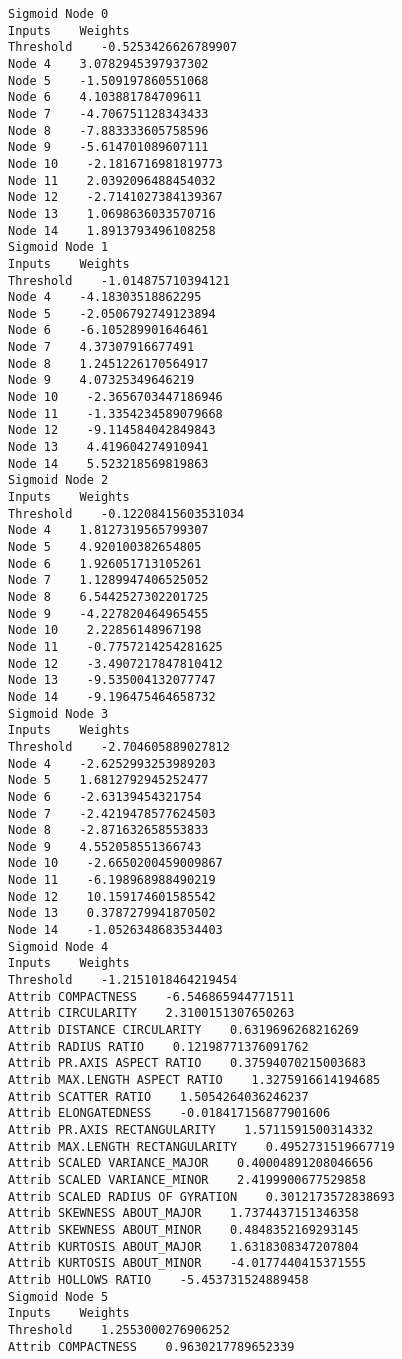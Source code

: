 \documentclass[
	article,			%
	11pt,				%
	oneside,			%
	a4paper,			%
	english,			%
	brazil,				%
	sumario=tradicional
	]{abntex2}
\begin{document}
\begin{lstlisting}
Sigmoid Node 0
Inputs    Weights
Threshold    -0.5253426626789907
Node 4    3.0782945397937302
Node 5    -1.509197860551068
Node 6    4.103881784709611
Node 7    -4.706751128343433
Node 8    -7.883333605758596
Node 9    -5.614701089607111
Node 10    -2.1816716981819773
Node 11    2.0392096488454032
Node 12    -2.7141027384139367
Node 13    1.0698636033570716
Node 14    1.8913793496108258
Sigmoid Node 1
Inputs    Weights
Threshold    -1.014875710394121
Node 4    -4.18303518862295
Node 5    -2.0506792749123894
Node 6    -6.105289901646461
Node 7    4.37307916677491
Node 8    1.2451226170564917
Node 9    4.07325349646219
Node 10    -2.3656703447186946
Node 11    -1.3354234589079668
Node 12    -9.114584042849843
Node 13    4.419604274910941
Node 14    5.523218569819863
Sigmoid Node 2
Inputs    Weights
Threshold    -0.12208415603531034
Node 4    1.8127319565799307
Node 5    4.920100382654805
Node 6    1.926051713105261
Node 7    1.1289947406525052
Node 8    6.5442527302201725
Node 9    -4.227820464965455
Node 10    2.22856148967198
Node 11    -0.7757214254281625
Node 12    -3.4907217847810412
Node 13    -9.535004132077747
Node 14    -9.196475464658732
Sigmoid Node 3
Inputs    Weights
Threshold    -2.704605889027812
Node 4    -2.6252993253989203
Node 5    1.6812792945252477
Node 6    -2.63139454321754
Node 7    -2.4219478577624503
Node 8    -2.871632658553833
Node 9    4.552058551366743
Node 10    -2.6650200459009867
Node 11    -6.198968988490219
Node 12    10.159174601585542
Node 13    0.3787279941870502
Node 14    -1.0526348683534403
Sigmoid Node 4
Inputs    Weights
Threshold    -1.2151018464219454
Attrib COMPACTNESS    -6.546865944771511
Attrib CIRCULARITY    2.3100151307650263
Attrib DISTANCE CIRCULARITY    0.6319696268216269
Attrib RADIUS RATIO    0.12198771376091762
Attrib PR.AXIS ASPECT RATIO    0.37594070215003683
Attrib MAX.LENGTH ASPECT RATIO    1.3275916614194685
Attrib SCATTER RATIO    1.5054264036246237
Attrib ELONGATEDNESS    -0.018417156877901606
Attrib PR.AXIS RECTANGULARITY    1.5711591500314332
Attrib MAX.LENGTH RECTANGULARITY    0.4952731519667719
Attrib SCALED VARIANCE_MAJOR    0.40004891208046656
Attrib SCALED VARIANCE_MINOR    2.4199900677529858
Attrib SCALED RADIUS OF GYRATION    0.3012173572838693
Attrib SKEWNESS ABOUT_MAJOR    1.7374437151346358
Attrib SKEWNESS ABOUT_MINOR    0.4848352169293145
Attrib KURTOSIS ABOUT_MAJOR    1.6318308347207804
Attrib KURTOSIS ABOUT_MINOR    -4.0177440415371555
Attrib HOLLOWS RATIO    -5.453731524889458
Sigmoid Node 5
Inputs    Weights
Threshold    1.2553000276906252
Attrib COMPACTNESS    0.9630217789652339

\end{lstlisting}
\end{document}
